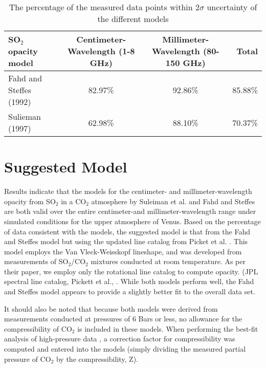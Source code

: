 \begin{sidewaystable}[p]

\caption{The percentage of the measured data points within $2\sigma$ uncertainty of the different models}
  \begin{tabular}{l | c c | r}
  \hline
  \hline
  SO$_2$ opacity model & Centimeter-Wavelength (1-8 GHz) & Millimeter-Wavelength (80-150 GHz) &Total\\
  \hline
  Fahd and Steffes (1992)	 & 82.97\%	& 	92.86\%& 85.88\%\\
  Sulieman (1997)& 62.98\%	&	88.10\%&70.37\%\\
  \hline
  \hline
  \end{tabular}
  \label{tab:model-comp}
\end{sidewaystable}

 


\clearpage

\section{Suggested Model}
Results indicate that the models for the centimeter- and millimeter-wavelength opacity from SO$_2$ in a CO$_2$ atmosphere by Suleiman et al. \cite{Suleiman-1996} and Fahd and Steffes \cite{Fahd-1991} are both valid over the entire centimeter-and millimeter-wavelength range under simulated conditions for the upper atmosphere of Venus. Based on the percentage of data consistent with the models, the suggested model is that from the Fahd and Steffes \cite{Fahd-thesis} model but using the updated line catalog from Picket et al. \cite{Pickett-1998}. This model employs the Van Vleck-Weisskopf lineshape, and was developed from measurements of SO$_2$/CO$_2$ mixtures conducted at room temperature. As per their paper, we employ only the rotational line catalog to compute opacity. (JPL spectral line catalog, Pickett et al., \cite{Pickett-1998}. While both models perform well, the Fahd and Steffes \cite{Fahd-1991}  model appears to provide a slightly better fit to the overall data set. 

It should also be noted that because both models were derived from measurements conducted at pressures of 6 Bars or less, no allowance for the compressibility of CO$_2$ is included in these models. When performing the best-fit analysis of high-pressure data \cite{Steffes-2014}, a correction factor for compressibility was computed and entered into the models (simply dividing the measured partial pressure of CO$_2$ by the compressibility, Z). 

